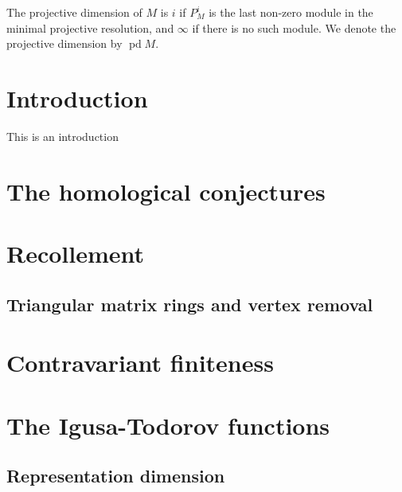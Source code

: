 \documentclass[11pt, a4paper, english]{article}
\theoremstyle{definition}
\DeclareMathOperator{\pd}{pd}
\begin{document}
The projective dimension of $M$ is $i$ if $P_M^i$ is the last non-zero module in the minimal projective resolution, and $\infty$ if there is no such module. We denote the projective dimension by $\pd M$.


\newpage

\section*{Introduction}
%

This is an introduction

\section{The homological conjectures}


\section{Recollement}


\subsection{Triangular matrix rings and vertex removal}\label{sec:Triangular_matrix_rings}


\section{Contravariant finiteness}


%

\section{The Igusa-Todorov functions} \label{sec:Igusa-Todorov}


\subsection{Representation dimension}

\end{document}
